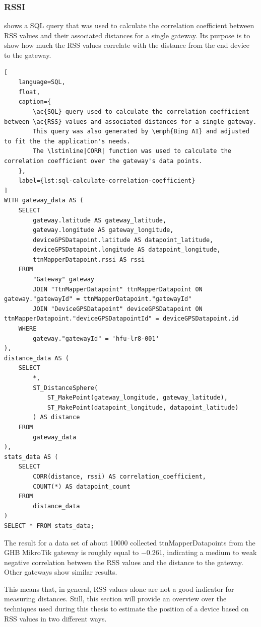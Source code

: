 \subsubsection{\acf{RSSI}}

 shows a \ac{SQL} query that was used to calculate the correlation coefficient between \ac{RSS} values and their associated distances for a single gateway.
Its purpose is to show how much the \ac{RSS} values correlate with the distance from the end device to the gateway.

\begin{lstlisting}[
    language=SQL,
    float,
    caption={
        \ac{SQL} query used to calculate the correlation coefficient between \ac{RSS} values and associated distances for a single gateway.
        This query was also generated by \emph{Bing AI} and adjusted to fit the the application's needs.
        The \lstinline|CORR| function was used to calculate the correlation coefficient over the gateway's data points.
    },
    label={lst:sql-calculate-correlation-coefficient}
]
WITH gateway_data AS (
    SELECT
        gateway.latitude AS gateway_latitude,
        gateway.longitude AS gateway_longitude,
        deviceGPSDatapoint.latitude AS datapoint_latitude,
        deviceGPSDatapoint.longitude AS datapoint_longitude,
        ttnMapperDatapoint.rssi AS rssi
    FROM
        "Gateway" gateway
        JOIN "TtnMapperDatapoint" ttnMapperDatapoint ON gateway."gatewayId" = ttnMapperDatapoint."gatewayId"
        JOIN "DeviceGPSDatapoint" deviceGPSDatapoint ON ttnMapperDatapoint."deviceGPSDatapointId" = deviceGPSDatapoint.id
    WHERE
        gateway."gatewayId" = 'hfu-lr8-001'
),
distance_data AS (
    SELECT
        *,
        ST_DistanceSphere(
            ST_MakePoint(gateway_longitude, gateway_latitude),
            ST_MakePoint(datapoint_longitude, datapoint_latitude)
        ) AS distance
    FROM
        gateway_data
),
stats_data AS (
    SELECT
        CORR(distance, rssi) AS correlation_coefficient,
		COUNT(*) AS datapoint_count
    FROM
        distance_data
)
SELECT * FROM stats_data;
\end{lstlisting}

The result for a data set of about \num{10000} collected ttnMapperDatapoints from the \ac{GHB} MikroTik gateway is roughly equal to \num{-0.261}, indicating a medium to weak negative correlation between the \ac{RSS} values and the distance to the gateway.
Other gateways show similar results.

This means that, in general, \ac{RSS} values alone are not a good indicator for measuring distances.
Still, this section will provide an overview over the techniques used during this thesis to estimate the position of a device based on \ac{RSS} values in two different ways.

